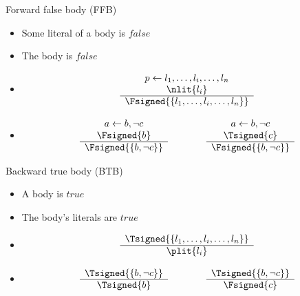 \begin{frame}{Forward false body (FFB)}
\begin{itemize}
\item {} Some literal of a body is $\mathit{false}$
\item {} The body is $\mathit{false}$
\item {}
\[
\begin{array}{c}
p \leftarrow l_1,\dots,l_i,\dots,l_n \\
\nlit{l_i} \\\hline
\Fsigned{\{l_1,\dots,l_i,\dots,l_n\}}
\end{array}
\]
\item<2-> 
\[
\begin{array}{c}
a \leftarrow b, \neg c \\
\Fsigned{b} \\\hline
\Fsigned{\{b, \neg c\}}
\end{array}
\qquad\qquad
\begin{array}{c}
a \leftarrow b, \neg c \\
\Tsigned{c} \\\hline
\Fsigned{\{b, \neg c\}}
\end{array}
\hfill
\]
\end{itemize}
\end{frame}
\begin{frame}{Backward true body (BTB)}
\begin{itemize}
\item {} A body is $\mathit{true}$
\item {} The body's literals are $\mathit{true}$
\item {}
\[
\begin{array}{c}
\Tsigned{\{l_1,\dots,l_i,\dots,l_n\}} \\\hline
\plit{l_i}
\end{array}
\]
\item<2-> 
\[
\begin{array}{c}
\Tsigned{\{b, \neg c\}} \\\hline
\Tsigned{b}
\end{array}
\qquad\qquad
\begin{array}{c}
\Tsigned{\{b, \neg c\}} \\\hline
\Fsigned{c}
\end{array}
\hfill
\]
\end{itemize}
\end{frame}
